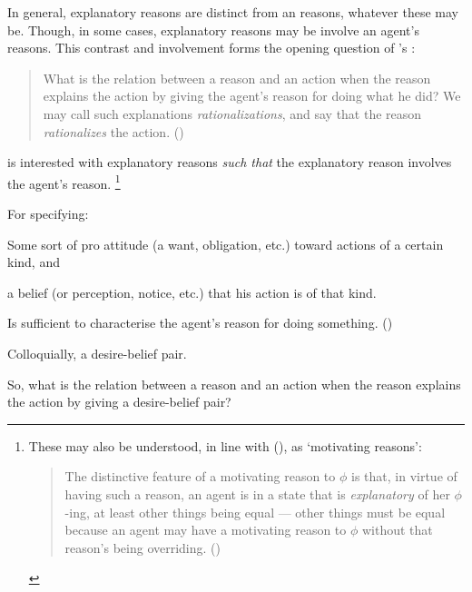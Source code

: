 \begin{note}
  In general, explanatory reasons are distinct from an \emph{\agents{}} reasons, whatever these may be.
  Though, in some cases, explanatory reasons may be involve an agent's reasons.
  This contrast and involvement forms the opening question of \citeauthor{Davidson:1963aa}'s :

  \begin{quote}
    What is the relation between a reason and an action when the reason explains the action by giving the agent's reason for doing what he did?
    We may call such explanations \emph{rationalizations}, and say that the reason \emph{rationalizes} the action.%
    \mbox{}\hfill\mbox{(\citeyear[685]{Davidson:1963aa})}
  \end{quote}

  \citeauthor{Davidson:1963aa} is interested with explanatory reasons \emph{such that} the explanatory reason involves the agent's reason.%
  \footnote{
    These may also be understood, in line with \citeauthor{Smith:1994wo} (\citeyear{Smith:1994wo}), as `motivating reasons':
    \begin{quote}
      The distinctive feature of a motivating reason to \(\phi\) is that, in virtue of having such a reason, an agent is in a state that is \emph{explanatory} of her \(\phi\)-ing, at least other things being equal --- other things must be equal because an agent may have a motivating reason to \(\phi\) without that reason's being overriding.%
      \mbox{}\hfill\mbox{(\citeyear[96]{Smith:1994wo})}
    \end{quote}
  }

  For \citeauthor{Davidson:1963aa} specifying:
  \begin{enumerate*}[label=(\alph*), ref=(\alph*)]
  \item
    Some sort of pro attitude (a want, obligation, etc.) toward actions of a certain kind, and
  \item
    a belief (or perception, notice, etc.) that his action is of that kind.
  \end{enumerate*}
  Is sufficient to characterise the agent's reason for doing something.
  (\citeyear[Cf.][685,686]{Davidson:1963aa})

  Colloquially, a desire-belief pair.

  So, what is the relation between a reason and an action when the reason explains the action by giving a desire-belief pair?
\end{note}

